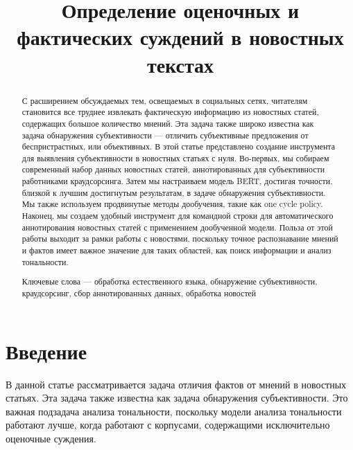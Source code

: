 \documentclass[conference]{IEEEtran}
\begin{document}
\title{Определение оценочных и фактических суждений в новостных текстах}

\author{
}

\maketitle
\thispagestyle{plain}

\begin{abstract}
С расширением обсуждаемых тем, освещаемых в социальных сетях, читателям становится все труднее извлекать фактическую информацию из новостных статей, содержащих большое количество мнений. Эта задача также широко известна как задача обнаружения субъективности — отличить субъективные предложения от беспристрастных, или объективных. В этой статье представлено создание инструмента для выявления субъективности в новостных статьях с нуля. Во-первых, мы собираем современный набор данных новостных статей, аннотированных для субъективности работниками краудсорсинга. Затем мы настраиваем модель BERT, достигая точности, близкой к лучшим достигнутым результатам, в задаче обнаружения субъективности. Мы также используем продвинутые методы дообучения, такие как one cycle policy. Наконец, мы создаем удобный инструмент для командной строки для автоматического аннотирования новостных статей с применением дообученной модели. Польза от этой работы выходит за рамки работы с новостями, поскольку точное распознавание мнений и фактов имеет важное значение для таких областей, как поиск информации и анализ тональности.

Ключевые слова --- обработка естественного языка, обнаружение субъективности, краудсорсинг, сбор аннотированных данных, обработка новостей
\end{abstract}

\section{Введение}
В данной статье рассматривается задача отличия фактов от мнений в новостных статьях. Эта задача также известна как задача обнаружения субъективности. Это важная подзадача анализа тональности, поскольку модели анализа тональности работают лучше, когда работают с корпусами, содержащими исключительно оценочные суждения.
\end{document}
